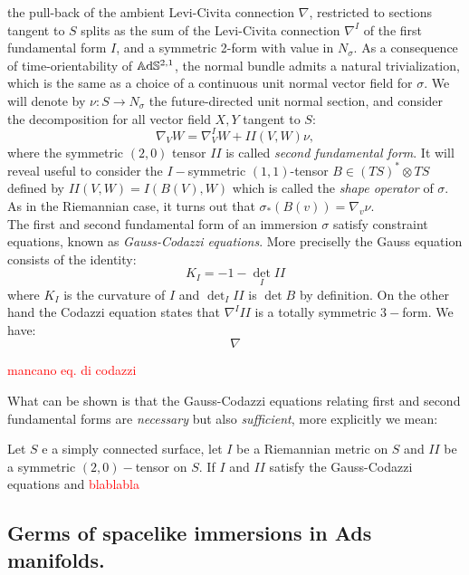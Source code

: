 the pull-back of the ambient Levi-Civita connection $\nabla$, restricted to sections tangent to $S$ splits as the sum of the Levi-Civita connection $\nabla^I$ of the first fundamental form $I$, and a symmetric 2-form with value in $N_\sigma$. As a consequence of time-orientability of $\mathbb{A}\mathrm{d}\mathbb{S}^{2,1}$, the normal bundle admits a natural trivialization, which is the same as a choice of a continuous unit normal vector field for $\sigma.$ We will denote by $\nu:S\to N_\sigma$ the future-directed unit normal section, and consider the decomposition for all vector field $X,Y$ tangent to $S$: 
\[
    \nabla_V W=\nabla^I_V W+II(V,W)\nu,
\]
where the symmetric $(2,0)$ tensor $II$ is called \textit{second fundamental form}. It will reveal useful to consider the $I-$symmetric $(1,1)$-tensor $B\in (TS)^*\otimes TS$ defined by $II(V,W)=I(B(V),W)$ which is called the \textit{shape operator} of $\sigma.$ As in the Riemannian case, it turns out that $\sigma_*(B(v))=\nabla_v\nu.$\\  
The first and second fundamental form of an immersion $\sigma$ satisfy constraint equations, known as \textit{Gauss-Codazzi equations}. More preciselly the Gauss equation consists of the identity: 
\begin{equation}\label{Gauss}
    K_I=-1-\det_I II
\end{equation}
where $K_I$ is the curvature of $I$ and $\det_I II$ is $\det B$ by definition. On the other hand the Codazzi equation states that $\nabla^III$ is a totally symmetric $3-$form. We have: 
\begin{equation} \nabla 
\end{equation}

\textcolor{red}{mancano eq. di codazzi}

What can be shown is that the Gauss-Codazzi equations relating first and second fundamental forms are \textit{necessary} but also \textit{sufficient}, more explicitly we mean:

\begin{theorem}\label{immcondition}
    Let $S$ e a simply connected surface, let $I$ be a Riemannian metric on $S$ and $II$  be a symmetric $(2,0)-$tensor on $S$. If $I$ and $II$ satisfy the Gauss-Codazzi equations  and  \textcolor{red}{blablabla}
\end{theorem}

\subsection{Germs of spacelike immersions in Ads manifolds.}

